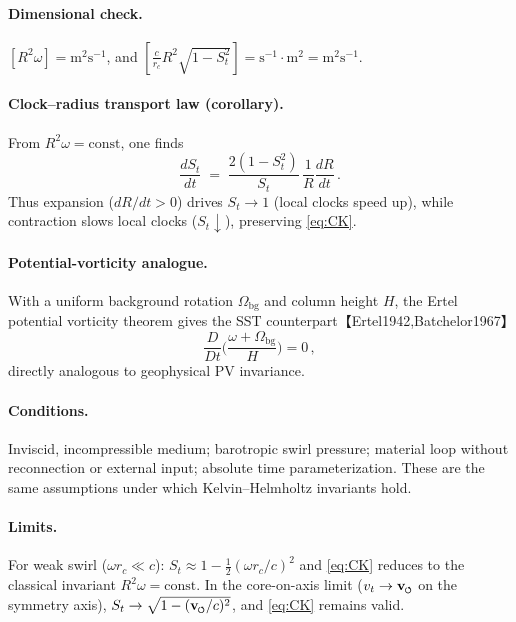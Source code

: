 \documentclass[11pt]{article}
\begin{document}
\paragraph{Dimensional check.}
    $[R^2\omega] = \mathrm{m}^2\mathrm{s}^{-1}$, and $[\frac{c}{r_c}R^2\sqrt{1-S_t^2}] = \mathrm{s}^{-1}\cdot \mathrm{m}^2 = \mathrm{m}^2\mathrm{s}^{-1}$.

\paragraph{Clock–radius transport law (corollary).}
    From $R^2\omega=\mathrm{const}$, one finds
    \begin{equation}
    \frac{dS_t}{dt} \;=\; \frac{2(1-S_t^2)}{S_t}\,\frac{1}{R}\frac{dR}{dt}\,.
    \label{eq:clock-radius-ode}
    \end{equation}
    Thus expansion ($dR/dt>0$) drives $S_t\to 1$ (local clocks speed up), while contraction slows local clocks ($S_t\downarrow$), preserving \eqref{eq:CK}.

\paragraph{Potential-vorticity analogue.}
    With a uniform background rotation $\Omega_{\text{bg}}$ and column height $H$, the Ertel potential vorticity theorem gives the SST counterpart【Ertel1942,Batchelor1967】
    \begin{equation}
    \frac{D}{Dt}\Big(\frac{\omega + \Omega_{\text{bg}}}{H}\Big)=0\,,
    \label{eq:PV-analogue}
    \end{equation}
    directly analogous to geophysical PV invariance.

\paragraph{Conditions.}
    Inviscid, incompressible medium; barotropic swirl pressure; material loop without reconnection or external input; absolute time parameterization. These are the same assumptions under which Kelvin–Helmholtz invariants hold.

\paragraph{Limits.}
    For weak swirl ($\omega r_c\ll c$): $S_t \approx 1-\tfrac{1}{2}(\omega r_c/c)^2$ and \eqref{eq:CK} reduces to the classical invariant $R^2\omega=\text{const}$. In the core-on-axis limit ($v_t\to\vswirl$ on the symmetry axis), $S_t \to \sqrt{1-(\vswirl/c)^2}$, and \eqref{eq:CK} remains valid.
\end{document}
